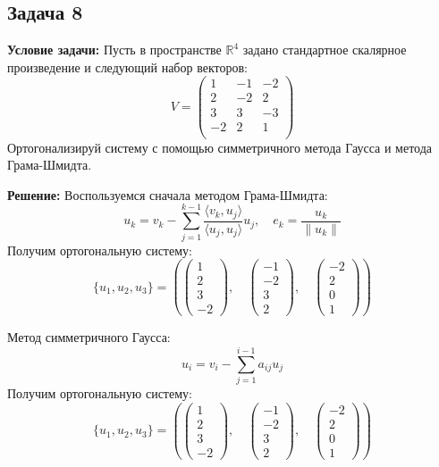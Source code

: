 \documentclass[a4paper,12pt]{article}
\begin{document}
\vspace{1cm}

\subsection{Задача 8}
\textbf{Условие задачи:} Пусть в пространстве $\mathbb{R}^4$ задано стандартное скалярное произведение и следующий набор векторов:
\[
V = \begin{pmatrix}
1 & -1 & -2 \\
2 & -2 & 2 \\
3 & 3 & -3 \\
-2 & 2 & 1 \\
\end{pmatrix}
\]
Ортогонализируй систему с помощью симметричного метода Гаусса и метода Грама-Шмидта.

\textbf{Решение:}
Воспользуемся сначала методом Грама-Шмидта:
\[
u_k = v_k - \sum_{j=1}^{k-1} \frac{\langle v_k, u_j \rangle}{\langle u_j, u_j \rangle} u_j, \quad e_k = \frac{u_k}{\|u_k\|}
\]
Получим ортогональную систему:
\[
\{u_1, u_2, u_3\} = \left( 
\begin{pmatrix}
1 \\ 2 \\ 3 \\ -2
\end{pmatrix}, \quad
\begin{pmatrix}
-1 \\ -2 \\ 3 \\ 2
\end{pmatrix}, \quad
\begin{pmatrix}
-2 \\ 2 \\ 0 \\ 1
\end{pmatrix}
\right)
\]

Метод симметричного Гаусса:
\[
u_i = v_i - \sum_{j=1}^{i-1} a_{ij} u_j
\]
Получим ортогональную систему:
\[
\{u_1, u_2, u_3\} = \left( 
\begin{pmatrix}
1 \\ 2 \\ 3 \\ -2
\end{pmatrix}, \quad
\begin{pmatrix}
-1 \\ -2 \\ 3 \\ 2
\end{pmatrix}, \quad
\begin{pmatrix}
-2 \\ 2 \\ 0 \\ 1
\end{pmatrix}
\right)
\]
\end{document}
